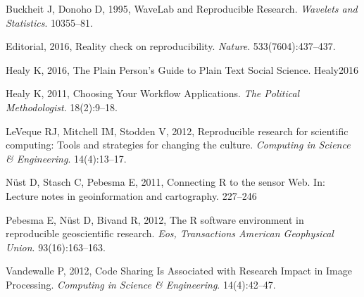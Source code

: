 \documentclass[]{article}
\begin{document}
\hypertarget{ref-Buckheit1995}{}
Buckheit J, Donoho D, 1995, WaveLab and Reproducible Research.
\emph{Wavelets and Statistics}. 10355--81.

\hypertarget{ref-Nature2016}{}
Editorial, 2016, Reality check on reproducibility. \emph{Nature}.
533(7604):437--437.

\hypertarget{ref-Healy2016}{}
Healy K, 2016, The Plain Person's Guide to Plain Text Social Science.
Healy2016

\hypertarget{ref-Healy2011}{}
Healy K, 2011, Choosing Your Workflow Applications. \emph{The Political
Methodologist}. 18(2):9--18.

\hypertarget{ref-Leveque2012}{}
LeVeque RJ, Mitchell IM, Stodden V, 2012, Reproducible research for
scientific computing: Tools and strategies for changing the culture.
\emph{Computing in Science \& Engineering}. 14(4):13--17.

\hypertarget{ref-Nuest2011}{}
Nüst D, Stasch C, Pebesma E, 2011, Connecting R to the sensor Web. In:
Lecture notes in geoinformation and cartography. 227--246

\hypertarget{ref-Pebesma2012}{}
Pebesma E, Nüst D, Bivand R, 2012, The R software environment in
reproducible geoscientific research. \emph{Eos, Transactions American
Geophysical Union}. 93(16):163--163.

\hypertarget{ref-Vandewalle2012}{}
Vandewalle P, 2012, Code Sharing Is Associated with Research Impact in
Image Processing. \emph{Computing in Science \& Engineering}.
14(4):42--47.
\end{document}
